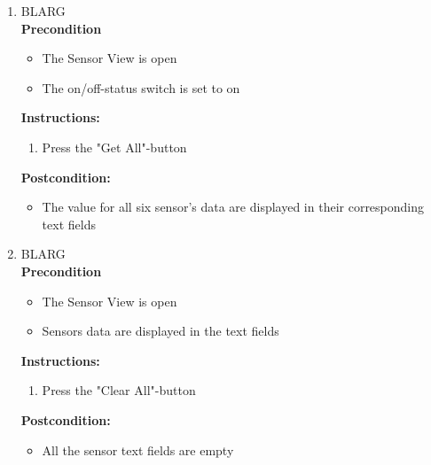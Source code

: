\documentclass[a4paper]{article}
\newlength{\testlabellength}
\newenvironment{testlist}{\begin{enumerate}[label=\bfseries Instruction \thesubsection.\arabic* , labelindent=0pt, labelwidth=\testlabellength , leftmargin=2cm]}{\end{enumerate}}
\newenvironment{precondition}{
{\color{white}BLARG}\\ 
\textbf{Precondition}
\begin{itemize}[labelindent=0cm, labelwidth=2cm , leftmargin=1cm]
}
{\end{itemize}}
\newenvironment{instruction}{
\textbf{Instructions:}
\begin{enumerate}[label=\bfseries  \arabic*., labelindent=0cm, labelwidth=2cm , leftmargin=1cm]
}
{\end{enumerate}}
\newenvironment{postcondition}{
\textbf{Postcondition:}
\begin{itemize}[labelindent=0cm, labelwidth=2cm , leftmargin=1cm]
}
{\end{itemize}}
\begin{document}
\begin{appendices}
\begin{testlist}



	\item
		\begin{precondition}
			\item The Sensor View is open
			\item The on/off-status switch is set to on
		\end{precondition}
		\begin{instruction}
			\item Press the "Get All"-button
		\end{instruction}
		\begin{postcondition}
			\item The value for all six sensor's data are displayed in their corresponding text fields
		\end{postcondition}

	\item
		\begin{precondition}
			\item The Sensor View is open
			\item Sensors data are displayed in the text fields
		\end{precondition}
		\begin{instruction}
			\item Press the "Clear All"-button
		\end{instruction}
		\begin{postcondition}
			\item All the sensor text fields are empty
		\end{postcondition}



\end{testlist}
\end{appendices}
\end{document}
